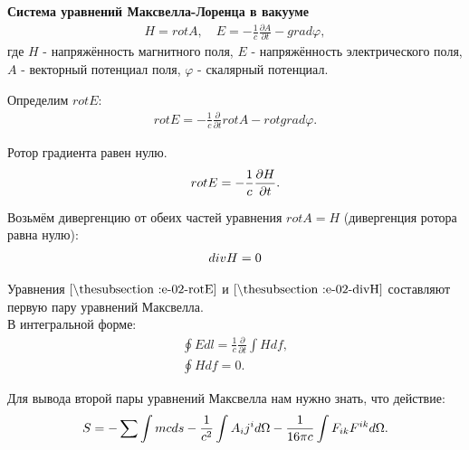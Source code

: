 \documentclass[__main__.tex]{subfiles}
\begin{document}
\textbf{Система уравнений Максвелла-Лоренца в вакууме}\\

\begin{gather*}
	H = rot A, \quad E = -\frac{1}{c}\frac{\partial A}{\partial t} - grad \varphi,
\end{gather*}
где $H$ - напряжённость магнитного поля, $E$ - напряжённость электрического поля,
$A$ - векторный потенциал поля,
$\varphi$ - скалярный потенциал.

Определим $rot E$:
\begin{gather*}
	rot E = -\frac{1}{c}\frac{\partial}{\partial t}rot A - rot grad \varphi.
\end{gather*}

Ротор градиента равен нулю.
\begin{gather}
	\llabel{e-02-rotE}
	rot E = -\frac{1}{c}\frac{\partial H}{\partial t}.
\end{gather}

Возьмём дивергенцию от обеих частей уравнения $rot A = H$ (дивергенция ротора равна нулю):
\begin{gather}
	\llabel{e-02-divH}
	div H = 0
\end{gather}

Уравнения $\lref{e-02-rotE}$ и  $\lref{e-02-divH}$ составляют первую пару уравнений Максвелла.\\
В интегральной форме:\\
\begin{gather*}
	\oint Edl = \frac{1}{c}\frac{\partial}{\partial t}\int Hdf,\\
	\oint H df = 0.
\end{gather*}

Для вывода второй пары уравнений Максвелла нам нужно знать, что действие:
\begin{gather}
	\llabel{e-02-S}
	S = -\sum\int mcds - \frac{1}{c^2}\int A_ij^id\Omega - \frac{1}{16\pi c}\int F_{ik}F^{ik}d\Omega.
\end{gather}
\end{document}
